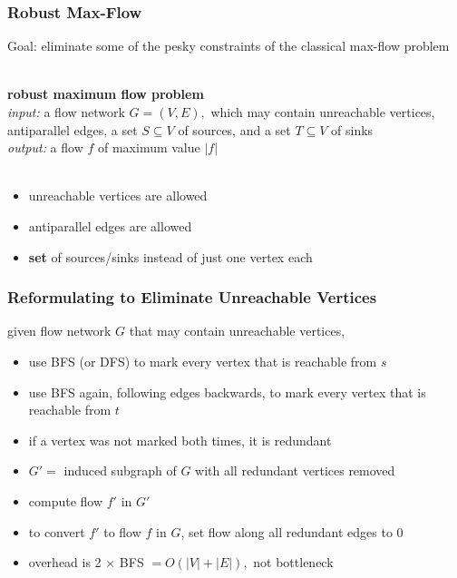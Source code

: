 \documentclass{beamer}
\newcommand{\stanza}{ \\~\ }
\begin{document}
\begin{frame} \frametitle{Robust Max-Flow}
Goal: eliminate some of the pesky constraints of the classical max-flow problem
\stanza

\textbf{robust maximum flow problem} \\
\emph{input:} a flow network $G=(V,E),$ which may contain unreachable vertices,
antiparallel edges, a set $S \subseteq V$ of sources, and a set $T \subseteq V$
  of sinks\\
\emph{output:} a flow $f$ of maximum value $|f|$ \stanza
\vspace{.5cm}
\begin{itemize}
  \item unreachable vertices are allowed
  \item antiparallel edges are allowed
  \item \textbf{set} of sources/sinks instead of just one vertex each
\end{itemize}
\end{frame}

\begin{frame} \frametitle{Reformulating to Eliminate Unreachable Vertices}
given flow network $G$ that may contain unreachable vertices,
\begin{itemize}
  \item use BFS (or DFS) to mark every vertex that is reachable from $s$
  \item use BFS again, following edges backwards, to mark every vertex that is reachable from $t$
  \item if a vertex was not marked both times, it is redundant
  \item $G' = $ induced subgraph of $G$ with all redundant vertices removed
  \item compute flow $f'$ in $G'$
  \item to convert $f'$ to flow $f$ in $G$, set flow along all redundant edges to 0
  \item overhead is 2 $\times$ BFS $= O(|V|+|E|),$ not bottleneck
\end{itemize}
\end{frame}
\end{document}
